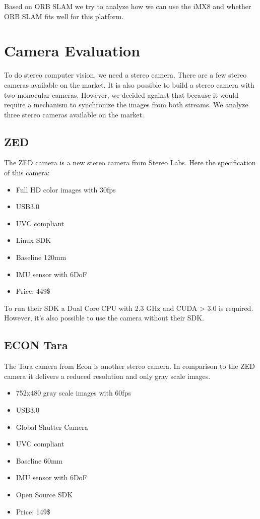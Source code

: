 \documentclass[11pt,a4paper,titlepage,oneside]{report}
\begin{document}
Based on ORB SLAM we try to analyze how we can use the iMX8 and whether ORB SLAM fits well for this platform.

\chapter{Camera Evaluation}

To do stereo computer vision, we need a stereo camera. There are a few stereo cameras available on the market. It is also possible to build a stereo camera with two monocular cameras. However, we decided against that because it would require a mechanism to synchronize the images from both streams. We analyze three stereo cameras available on the market.

\section{ZED}
The ZED camera is a new stereo camera from Stereo Labs. Here the specification of this camera:
\begin{itemize}
	\item Full HD color images with 30fps
	\item USB3.0
	\item UVC compliant
	\item Linux SDK
	\item Baseline 120mm
	\item IMU sensor with 6DoF
	\item Price: 449\$
\end{itemize}

To run their SDK a Dual Core CPU with 2.3 GHz and CUDA > 3.0 is required. However, it's also possible to use the camera without their SDK.

\section{ECON Tara}
The Tara camera from Econ is another stereo camera. In comparison to the ZED camera it delivers a reduced resolution and only gray scale images.
\begin{itemize}
	\item 752x480 gray scale images with 60fps
	\item USB3.0
	\item Global Shutter Camera
	\item UVC compliant
	\item Baseline 60mm
	\item IMU sensor with 6DoF
	\item Open Source SDK
	\item Price: 149\$
\end{itemize}
\end{document}
